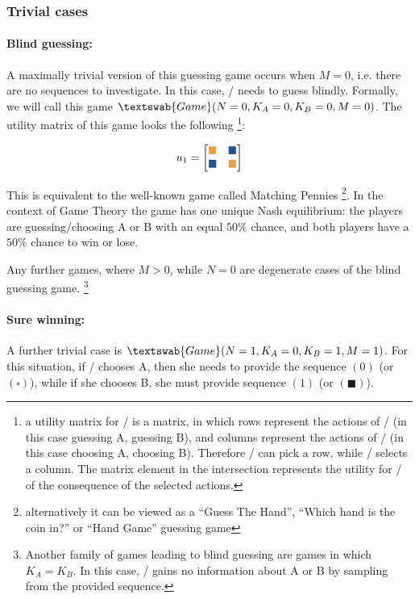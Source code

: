 \documentclass{article}
\newcommand{\wbox}{\textcolor{w}{\blacksquare}}
\newcommand{\lbox}{\textcolor{l}{\blacksquare}}
\newcommand{\wb}{\square}
\newcommand{\bb}{\blacksquare}
\theoremstyle{definition}
\newcommand{\G}[1]{$\textswab{Game}(#1)$}
\begin{document}
\subsubsection{Trivial cases}
\label{sec:FisherTrivialCases}

\paragraph{Blind guessing:}
A maximally trivial version of this guessing game occurs when $M=0$, i.e. there are no sequences to investigate. In this case, \PI/ needs to guess blindly.
Formally, we will call this game \G{N=0,K_A=0,K_B=0,M=0}.
The utility matrix of this game looks the following \footnote{a utility matrix for \PI/ is a matrix, in which rows represent the actions of \PI/ (in this case guessing A, guessing B), and columns represent the actions of \PII/ (in this case choosing A, choosing B). Therefore \PI/ can pick a row, while \PII/ selects a column. The matrix element in the intersection represents the utility for \PI/ of the consequence of the selected actions.}:

\begin{equation*}
u_1=
\begin{bmatrix}
\wbox & \lbox \\
\lbox & \wbox
\end{bmatrix}
\end{equation*}

This is equivalent to the well-known game called Matching Pennies \cite{book:EssentialGameTheory} \footnote{alternatively it can be viewed as a ``Guess The Hand'', ``Which hand is the coin in?'' or ``Hand Game'' \cite{book:CulinIndianGames,book:PrehistoricGames} guessing game}. In the context of Game Theory \cite{book:EssentialGameTheory,book:GameTheory,review:NeumannMorgensternGameThoery,book:GameTheoryOriginal} the game has one unique Nash equilibrium: the players are guessing/choosing A or B with an equal $50\%$ chance, and both players have a $50\%$ chance to win or lose.

Any further games, where $M > 0$, while $N=0$ are degenerate \cite{book:AlgorithmicGameTheory} cases of the blind guessing game. \footnote{Another family of games leading to blind guessing are games in which $K_A=K_B$. In this case, \PI/ gains no information about A or B by sampling from the provided sequence.}

\paragraph{Sure winning:}
A further trivial case is \G{N=1,K_A=0,K_B=1,M=1}. For this situation, if \PII/ chooses A, then she needs to provide the sequence $(0)$ (or $(\wb)$), while if she chooses B, she must provide sequence $(1)$ (or $(\bb)$).
\end{document}
